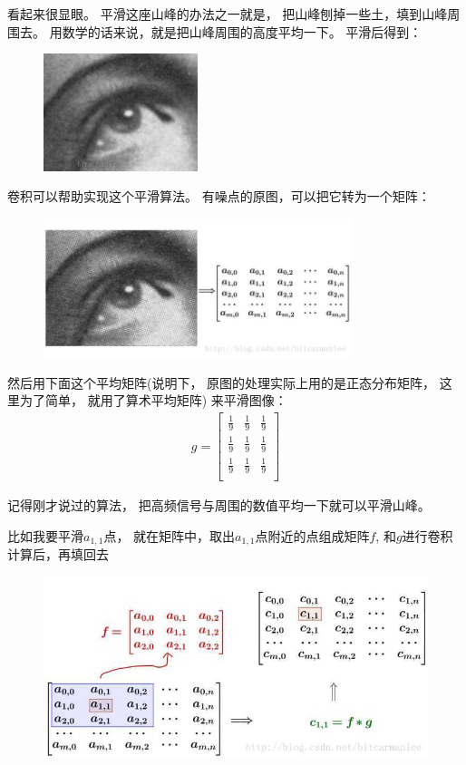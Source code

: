 看起来很显眼。%
平滑这座山峰的办法之一就是，%
把山峰刨掉一些土，填到山峰周围去。%
用数学的话来说，就是把山峰周围的高度平均一下。%
平滑后得到： %
\begin{figure}[hpbt]
  \centering
  \includegraphics[width=0.4\textwidth]{图像及其数学与物理背景/Figures/图像卷积原理3}
\end{figure}

卷积可以帮助实现这个平滑算法。%
有噪点的原图，可以把它转为一个矩阵： 
\begin{figure}[hpbt]
  \centering
  \includegraphics[width=0.8\textwidth]{图像及其数学与物理背景/Figures/图像卷积原理4}
\end{figure}

然后用下面这个平均矩阵(说明下，%
原图的处理实际上用的是正态分布矩阵，%
这里为了简单，%
就用了算术平均矩阵)%
来平滑图像：
\begin{gather}
  g = 
  \begin{bmatrix}
    \frac{1}{9} & \frac{1}{9} & \frac{1}{9} \\
    \frac{1}{9} & \frac{1}{9} & \frac{1}{9} \\
    \frac{1}{9} & \frac{1}{9} & \frac{1}{9} \\
  \end{bmatrix}
\end{gather}

记得刚才说过的算法，%
把高频信号与周围的数值平均一下就可以平滑山峰。%

比如我要平滑$a_{1,1}$点，%
就在矩阵中，取出$a_{1,1}$点附近的点组成矩阵$f$,%
和$g$进行卷积计算后，再填回去
\begin{figure}[hpbt]
  \centering
  \includegraphics[width=\textwidth]{图像及其数学与物理背景/Figures/图像卷积原理5}
\end{figure}

